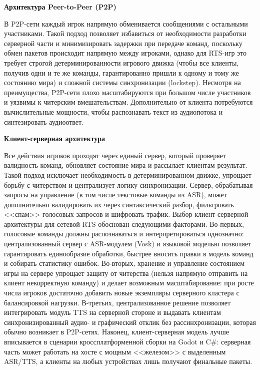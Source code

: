         \textbf{Архитектура Peer-to-Peer (P2P)}

        В P2P-сети каждый игрок напрямую обменивается сообщениями с остальными участниками. Такой подход позволяет избавиться от необходимости разработки серверной части и минимизировать задержки при передаче команд, поскольку обмен пакетов происходит напрямую между игроками, однако для RTS-игр это требует строгой детерминированности игрового движка (чтобы все клиенты, получив одни и те же команды, гарантированно пришли к одному и тому же состоянию мира) и сложной системы синхронизации (lockstep). Несмотря на преимущества, P2P-сети плохо масштабируются при большом числе участников и уязвимы к читерским вмешательствам. Дополнительно от клиента потребуются вычислительные мощности, чтобы распознавать текст из аудиопотока и синтезировать аудиоответ.
        
        \textbf{Клиент-серверная архитектура}

        Все действия игроков проходят через единый сервер, который проверяет валидность команд, обновляет состояние мира и рассылает клиентам результат. Такой подход исключает необходимость в детерминированном движке, упрощает борьбу с читерством и централизует логику синхронизации. Сервер, обрабатывая запросы на управление (в том числе текстовые команды из ASR), может дополнительно валидировать их через синтаксический разбор, фильтровать <<спам>> голосовых запросов и шифровать трафик. Выбор клиент-серверной архитектуры для сетевой RTS обоснован следующими факторами. Во-первых, голосовые команды должны распознаваться и интерпретироваться однозначно: централизованный сервер с ASR-модулем (Vosk) и языковой моделью позволяет гарантировать единообразие обработки, быстрее вносить правки в модель команд и собирать статистику ошибок. Во-вторых, хранение и управление состоянием игры на сервере упрощает защиту от читерства (нельзя напрямую отправить на клиент некорректную команду) и делает возможным масштабирование: при росте числа игроков достаточно добавить новые экземпляры серверного кластера с балансировкой нагрузки. В-третьих, централизованное решение позволяет интегрировать модуль TTS на серверной стороне и выдавать клиентам синхронизированный аудио- и графический отклик без рассинхронизации, которая обычно возникает в P2P-сетях. Наконец, клиент-серверная модель лучше вписывается в сценарии кроссплатформенной сборки на Godot и C\#: серверная часть может работать на хосте с мощным <<железом>> с выделенным ASR/TTS, а клиенты на любых устройствах лишь получают финальные пакеты.
        
